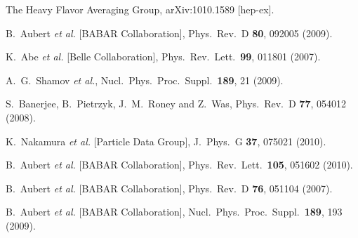 \documentclass[fleqn,twoside]{article}
\begin{document}
\begin{thebibliography}{99}
  The Heavy Flavor Averaging Group, %
  arXiv:1010.1589 [hep-ex].

  B.~Aubert {\it et al.}  [BABAR Collaboration],
  Phys.\ Rev.\  D {\bf 80}, 092005 (2009).

  K.~Abe {\it et al.}  [Belle Collaboration],
  Phys.\ Rev.\ Lett.\  {\bf 99}, 011801 (2007).

  A.~G.~Shamov {\it et al.},
  Nucl.\ Phys.\ Proc.\ Suppl.\  {\bf 189}, 21 (2009).

  S.~Banerjee, B.~Pietrzyk, J.~M.~Roney and Z.~Was,
  Phys.\ Rev.\  D {\bf 77}, 054012 (2008).

  K.~Nakamura {\it et al.}  [Particle Data Group],
  J.\ Phys.\ G {\bf 37}, 075021 (2010).

  B.~Aubert {\it et al.}  [BABAR Collaboration],
  Phys.\ Rev.\ Lett.\  {\bf 105}, 051602 (2010).

  B.~Aubert {\it et al.}  [BABAR Collaboration],
  Phys.\ Rev.\  D {\bf 76}, 051104 (2007).

  B.~Aubert {\it et al.}  [BABAR Collaboration],
  Nucl.\ Phys.\ Proc.\ Suppl.\  {\bf 189}, 193 (2009).


\end{thebibliography}
\end{document}
